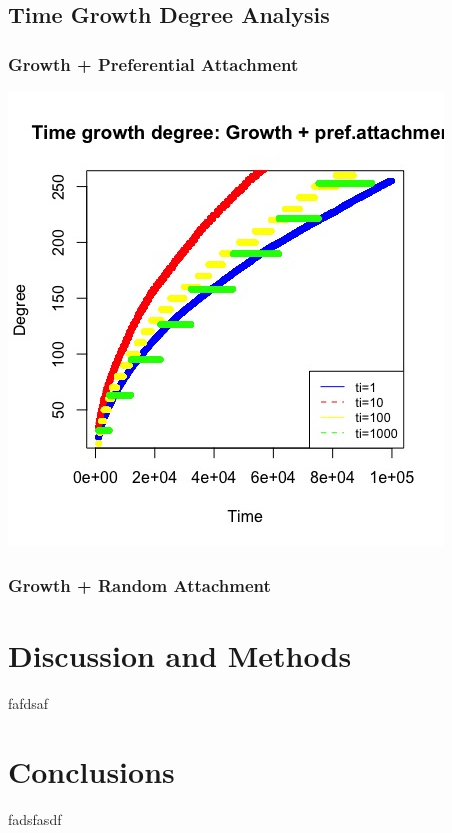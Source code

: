 \documentclass[12pt, a4paper]{article}
\begin{document}
\subsection{Time Growth Degree Analysis}
\subsubsection{Growth + Preferential Attachment}
\begin{minipage}[t]{\linewidth}
    \includegraphics[width=\textwidth]{time_growth_degree_pref_att}
    \captionsetup{type=figure}
    \label{fig:time_growth_degree_pref_att}
  \end{minipage}
\subsubsection{Growth + Random Attachment}


\section{Discussion and Methods}
fafdsaf

\section{Conclusions}
fadsfasdf
\end{document}
